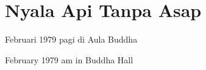 \chapter{Nyala Api Tanpa Asap} %

 Februari 1979 pagi di Aula Buddha

 February 1979 am in Buddha Hall
